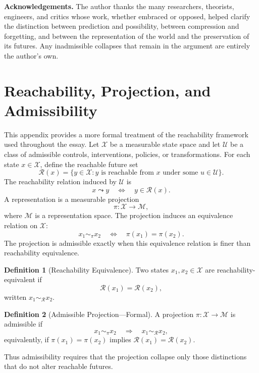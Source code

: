 \documentclass[12pt,a4paper]{article}
\theoremstyle{plain}
\theoremstyle{definition}
\newtheorem{definition}{Definition}
\theoremstyle{remark}
\begin{document}
\bigskip

\noindent\textbf{Acknowledgements.} The author thanks the many researchers,
theorists, engineers, and critics whose work, whether embraced or opposed,
helped clarify the distinction between prediction and possibility, between
compression and forgetting, and between the representation of the world and
the preservation of its futures. Any inadmissible collapses that remain in
the argument are entirely the author's own.


\appendix

\section{Reachability, Projection, and Admissibility}

This appendix provides a more formal treatment of the reachability framework
used throughout the essay. Let $\mathcal{X}$ be a measurable state space and
let $\mathcal{U}$ be a class of admissible controls, interventions, policies,
or transformations. For each state $x \in \mathcal{X}$, define the reachable
future set
\[
  \mathcal{R}(x)
  =
  \{y \in \mathcal{X} : y \text{ is reachable from } x
  \text{ under some } u \in \mathcal{U}\}.
\]
The reachability relation induced by $\mathcal{U}$ is
\[
  x \leadsto y
  \quad\Longleftrightarrow\quad
  y \in \mathcal{R}(x).
\]
A representation is a measurable projection
\[
  \pi : \mathcal{X} \to \mathcal{M},
\]
where $\mathcal{M}$ is a representation space. The projection induces an
equivalence relation on $\mathcal{X}$:
\[
  x_1 \sim_\pi x_2
  \quad\Longleftrightarrow\quad
  \pi(x_1) = \pi(x_2).
\]
The projection is admissible exactly when this equivalence relation is finer
than reachability equivalence.

\begin{definition}[Reachability Equivalence]
Two states $x_1, x_2 \in \mathcal{X}$ are reachability-equivalent if
\[
  \mathcal{R}(x_1) = \mathcal{R}(x_2),
\]
written $x_1 \sim_{\mathcal{R}} x_2$.
\end{definition}

\begin{definition}[Admissible Projection---Formal]
A projection $\pi : \mathcal{X} \to \mathcal{M}$ is admissible if
\[
  x_1 \sim_\pi x_2
  \quad\Longrightarrow\quad
  x_1 \sim_{\mathcal{R}} x_2,
\]
equivalently, if $\pi(x_1) = \pi(x_2)$ implies $\mathcal{R}(x_1) =
\mathcal{R}(x_2)$.
\end{definition}

Thus admissibility requires that the projection collapse only those distinctions
that do not alter reachable futures.
\end{document}
